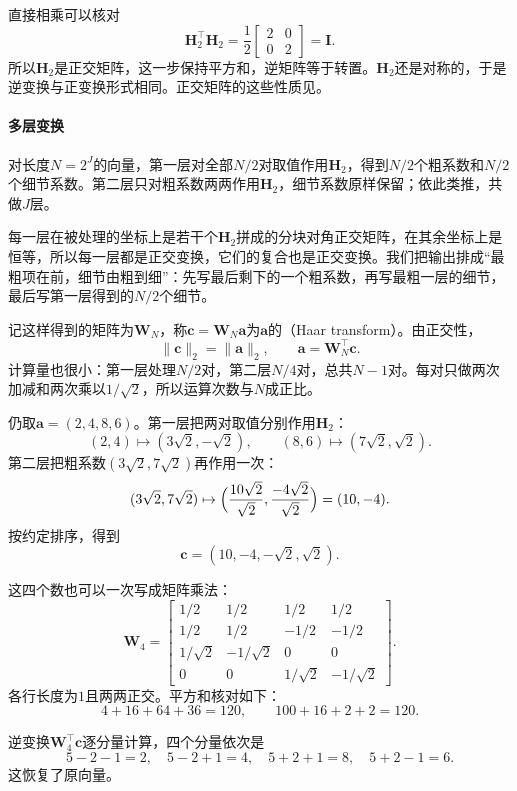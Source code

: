 直接相乘可以核对
\[
 \bm H_2^{\top}\bm H_2=\frac12\begin{bmatrix}2&0\\0&2\end{bmatrix}=\bm I.
\]
所以$\bm H_2$是正交矩阵，这一步保持平方和，逆矩阵等于转置。$\bm H_2$还是对称的，于是逆变换与正变换形式相同。正交矩阵的这些性质见。

\paragraph{多层变换}
对长度$N=2^J$的向量，第一层对全部$N/2$对取值作用$\bm H_2$，得到$N/2$个粗系数和$N/2$个细节系数。第二层只对粗系数两两作用$\bm H_2$，细节系数原样保留；依此类推，共做$J$层。

每一层在被处理的坐标上是若干个$\bm H_2$拼成的分块对角正交矩阵，在其余坐标上是恒等，所以每一层都是正交变换，它们的复合也是正交变换。我们把输出排成“最粗项在前，细节由粗到细”：先写最后剩下的一个粗系数，再写最粗一层的细节，最后写第一层得到的$N/2$个细节。

记这样得到的矩阵为$\bm W_N$，称$\bm c=\bm W_N\bm a$为$\bm a$的（Haar transform）。由正交性，
\begin{equation}
 \lVert\bm c\rVert_2=\lVert\bm a\rVert_2,\qquad \bm a=\bm W_N^{\top}\bm c.
 \label{eq:wavelet-finite-haar-isometry}
\end{equation}
计算量也很小：第一层处理$N/2$对，第二层$N/4$对，总共$N-1$对。每对只做两次加减和两次乘以$1/\sqrt2$，所以运算次数与$N$成正比。

\begin{example}[四个取值的正交Haar变换]
\label{ex:wavelet-four-values-orthogonal}
仍取$\bm a=(2,4,8,6)$。第一层把两对取值分别作用$\bm H_2$：
\[
 (2,4)\mapsto(3\sqrt2,-\sqrt2),\qquad(8,6)\mapsto(7\sqrt2,\sqrt2).
\]
第二层把粗系数$(3\sqrt2,7\sqrt2)$再作用一次：
\[
 (3\sqrt2,7\sqrt2)\mapsto\Bigl(\frac{10\sqrt2}{\sqrt2},\frac{-4\sqrt2}{\sqrt2}\Bigr)=(10,-4).
\]
按约定排序，得到
\[
 \bm c=(10,-4,-\sqrt2,\sqrt2).
\]

这四个数也可以一次写成矩阵乘法：
\[
 \bm W_4=\begin{bmatrix}
 1/2&1/2&1/2&1/2\\
 1/2&1/2&-1/2&-1/2\\
 1/\sqrt2&-1/\sqrt2&0&0\\
 0&0&1/\sqrt2&-1/\sqrt2
 \end{bmatrix}.
\]
各行长度为$1$且两两正交。平方和核对如下：
\[
 4+16+64+36=120,\qquad 100+16+2+2=120.
\]

逆变换$\bm W_4^{\top}\bm c$逐分量计算，四个分量依次是
\[
 5-2-1=2,\quad5-2+1=4,\quad5+2+1=8,\quad5+2-1=6.
\]
这恢复了原向量。
\end{example}

